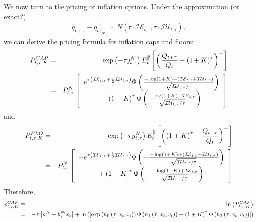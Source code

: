 \documentclass{article}
\begin{document}
We now turn to the pricing of inflation options. Under the approximation (or
exact?) 
\begin{equation*}
\left. q_{t+\tau }-q_{t}\right\vert _{\mathcal{F}_{t}}\sim N\left( \tau
\cdot \mathcal{IE}_{t,\tau },\tau \cdot \mathcal{IU}_{t,\tau }\right) ,
\end{equation*}%
we can derive the pricing formula for inflation caps and floors:%
\begin{eqnarray*}
P_{t,\tau ,K}^{CAP} &=&\exp \left( -\tau y_{t,\tau }^{N}\right) E_{t}^{%
\mathbb{\tilde{P}}}\left[ \left( \frac{Q_{t+\tau }}{Q_{t}}-\left( 1+K\right)
^{\tau }\right) ^{+}\right]  \\
&=&P_{t,\tau }^{N}\left[ 
\begin{array}{c}
e^{\tau \left( \mathcal{IE}_{t,\tau }+\frac{1}{2}\mathcal{IU}_{t,\tau
}\right) }\Phi \left( \frac{-\log \left( 1+K\right) +\left( \mathcal{IE}%
_{t,\tau }+\mathcal{IU}_{t,\tau }\right) }{\sqrt{\mathcal{IU}_{t,\tau }/\tau 
}}\right)  \\ 
-\left( 1+K\right) ^{\tau }\Phi \left( \frac{-\log \left( 1+K\right) +%
\mathcal{IE}_{t,\tau }}{\sqrt{\mathcal{IU}_{t,\tau }/\tau }}\right) 
\end{array}%
\right] 
\end{eqnarray*}%
and%
\begin{eqnarray*}
P_{t,\tau ,K}^{FLO} &=&\exp \left( -\tau y_{t,\tau }^{N}\right) E_{t}^{%
\mathbb{\tilde{P}}}\left[ \left( \left( 1+K\right) ^{\tau }-\frac{Q_{t+\tau }%
}{Q_{t}}\right) ^{+}\right]  \\
&=&P_{t,\tau }^{N}\left[ 
\begin{array}{c}
-e^{\tau \left( \mathcal{IE}_{t,\tau }+\frac{1}{2}\mathcal{IU}_{t,\tau
}\right) }\Phi \left( -\frac{-\log \left( 1+K\right) +\left( \mathcal{IE}%
_{t,\tau }+\mathcal{IU}_{t,\tau }\right) }{\sqrt{\mathcal{IU}_{t,\tau }/\tau 
}}\right)  \\ 
+\left( 1+K\right) ^{\tau }\Phi \left( -\frac{-\log \left( 1+K\right) +%
\mathcal{IE}_{t,\tau }}{\sqrt{\mathcal{IU}_{t,\tau }/\tau }}\right) 
\end{array}%
\right] 
\end{eqnarray*}%
Therefore,%
\begin{eqnarray}
p_{t,\tau ,K}^{CAP} &\equiv &\ln \left( P_{t,\tau ,K}^{CAP}\right)   \notag
\\
&=&-\tau \left[ a_{\tau }^{N}+b_{\tau }^{N\prime }x_{t}\right] +\ln \left( %
\left[ \exp \left( h_{0}\left( \tau ,x_{t},v_{t}\right) \right) \Phi \left(
h_{1}\left( \tau ,x_{t},v_{t}\right) \right) -\left( 1+K\right) ^{\tau }\Phi
\left( h_{2}\left( \tau ,x_{t},v_{t}\right) \right) \right] \right) 
\end{eqnarray}%
\end{document}
